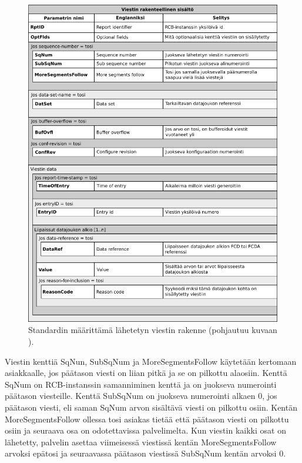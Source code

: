 \begin{figure}[ht!]
	\includegraphics[width=1\textwidth]{pictures/iec61850-report-format.png}
	\caption{Standardin määrittämä lähetetyn viestin rakenne (pohjautuu kuvaan \cite[s.~104]{IEC61850-7-2}).}
	\label{fig:iec61850-report-format}
\end{figure}

Viestin kenttiä SqNun, SubSqNum ja MoreSegmentsFollow käytetään kertomaan asiakkaalle, jos päätason viesti on liian pitkä ja se on pilkottu alaosiin. Kenttä SqNum on RCB-instanssin samanniminen kenttä ja on juokseva numerointi päätason viesteille. Kenttä SubSqNum on juokseva numerointi alkaen 0, jos päätason viesti, eli saman SqNum arvon sisältävä viesti on pilkottu osiin. Kentän MoreSegmentsFollow ollessa tosi asiakas tietää että päätason viesti on pilkottu osiin ja seuraava osa on odotettavissa palvelimelta. Kun viestin kaikki osat on lähetetty, palvelin asettaa viimeisessä viestissä kentän MoreSegmentsFollow arvoksi epätosi ja seuraavassa päätason viestissä SubSqNum kentän arvoksi 0. \cite[s.~105--106]{IEC61850-7-2}


